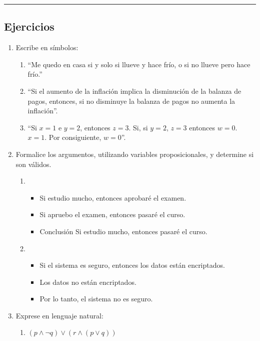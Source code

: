\rule{\textwidth}{.5pt}

\subsection{Ejercicios}

\begin{enumerate}[label=\textbf{\arabic*}.]
	\item Escribe en símbolos:
	\begin{enumerate}[itemsep=-2pt, label=\alph*)]
		\item ``Me quedo en casa si y solo si llueve y hace frío, o si no llueve pero hace frío.''
		\item ``Si el aumento de la inflación implica la disminución de la balanza de pagos, entonces, si no disminuye la balanza de pagos no aumenta la inflación''.
		\item ``Si $x = 1$ e $y = 2$, entonces $z = 3$. Si, si $y = 2$, $z = 3$ entonces $w = 0$. $x = 1$. Por consiguiente, $w = 0$''.
	\end{enumerate}
	
	\item Formalice los argumentos, utilizando variables proposicionales, y determine si son válidos.
	\begin{enumerate}[label=\alph*)]
		\item \begin{itemize}[itemsep=-3pt]
			\item Si estudio mucho, entonces aprobaré el examen.
			\item Si apruebo el examen, entonces pasaré el curso.
			\item Conclusión Si estudio mucho, entonces pasaré el curso.
		\end{itemize}
		\item \begin{itemize}[itemsep=-3pt]
			\item Si el sistema es seguro, entonces los datos están encriptados.
			\item Los datos no están encriptados.
			\item Por lo tanto, el sistema no es seguro.
		\end{itemize}
	\end{enumerate}
	
	\item Exprese en lenguaje natural:
	\begin{enumerate}[label=\alph*)]
		\item \( (p \land \neg q) \lor (r \land (p \lor q))  \)
		

\end{enumerate}
\end{enumerate}
